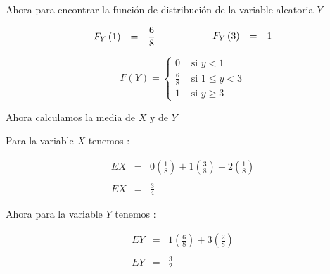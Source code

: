 \documentclass[12pt]{article}
\begin{document}
\begin{flushleft}
    Ahora para encontrar la funci\'on de distribuci\'on de la variable aleatoria $Y$
\end{flushleft}


\begin{equation*}
    \begin{array}{cp{1cm}c}
        \begin{array}{ccc}
            F_{Y} \left(1\right) & = & \displaystyle \frac{6}{8}
        \end{array}
         &
         &
        \begin{array}{ccc}
            F_{Y} \left(3\right) & = & 1
        \end{array}
    \end{array}
\end{equation*}

\begin{equation*}
    F\left(Y\right) = \begin{cases}
        0           & \mbox{ si   $y < 1 $}
        \\
        \frac{6}{8} & \mbox{ si   $1\leq y < 3$}
        \\
        1           & \mbox{ si   $y\geq 3$}
    \end{cases}
\end{equation*}

\begin{flushleft}
    Ahora calculamos la media de $X$ y de $Y$
\end{flushleft}

\begin{flushleft}
    Para la variable $X$ tenemos :
\end{flushleft}

\begin{equation*}
    \begin{array}{rcl}
        EX & = & \displaystyle 0 \left(\frac{1}{8}\right) + 1 \left(\frac{3}{8}\right) + 2 \left(\frac{1}{8}\right)
        \\
        \\
        EX & = & \displaystyle \frac{3}{4}
    \end{array}
\end{equation*}

\begin{flushleft}
    Ahora para la variable $Y$ tenemos :
\end{flushleft}

\begin{equation*}
    \begin{array}{rcl}
        EY & = & \displaystyle 1 \left(\frac{6}{8}\right) + 3 \left(\frac{2}{8}\right)
        \\
        \\
        EY & = & \displaystyle \frac{3}{2}
    \end{array}
\end{equation*}
\end{document}
